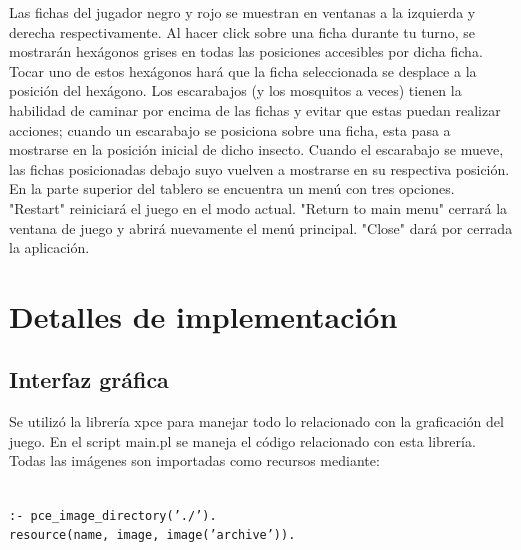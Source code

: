 \documentclass[a4paper,12pt]{article}
\begin{document}
Las fichas del jugador negro y rojo se muestran en ventanas a la izquierda y derecha respectivamente. Al hacer click sobre una ficha durante tu turno, se mostrarán hexágonos grises en todas las posiciones accesibles por dicha ficha. Tocar uno de estos hexágonos hará que la ficha seleccionada se desplace a la posición del hexágono. Los escarabajos (y los mosquitos a veces) tienen la habilidad de caminar por encima de las fichas y evitar que estas puedan realizar acciones; cuando un escarabajo se posiciona sobre una ficha, esta pasa a mostrarse en la posición inicial de dicho insecto. Cuando el escarabajo se mueve, las fichas posicionadas debajo suyo vuelven a mostrarse en su respectiva posición.\\
En la parte superior del tablero se encuentra un menú con tres opciones. "Restart" reiniciará el juego en el modo actual. "Return to main menu" cerrará la ventana de juego y abrirá nuevamente el menú principal. "Close" dará por cerrada la aplicación.

\section*{Detalles de implementación}
\subsection*{Interfaz gráfica}
Se utilizó la librería xpce para manejar todo lo relacionado con la graficación del juego. En el script main.pl se maneja el código relacionado con esta librería. Todas las imágenes son importadas como recursos mediante: 

\texttt{\\:- pce\_image\_directory('./').\\ resource(name, image, image('archive')).} \\
\end{document}
